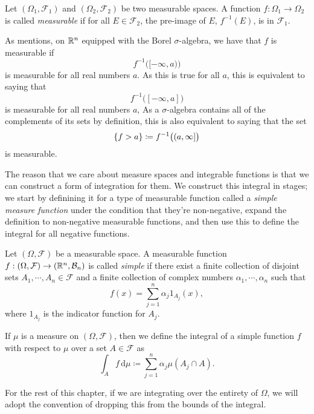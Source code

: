 \begin{definition}
  Let $(\Omega_1, \mathcal{F}_1)$ and $(\Omega_2, \mathcal{F}_2)$ be two measurable spaces. A function $f: \Omega_1 \to \Omega_2$ is called {\emph{measurable}} if for all $E \in \mathcal{F}_2$, the pre-image of $E$, $f^{-1}(E)$, is in $\mathcal{F}_1$.
\end{definition}
\begin{remark}
  As {\cite[p.28]{stein}} mentions, on $\mathbb{R}^n$ equipped with the Borel $\sigma$-algebra, we have that $f$ is measurable if
  \begin{equation*}
    f^{-1}\big( [-\infty, a) \big)
  \end{equation*}
  is measurable for all real numbers $a$. As this is true for all $a$, this is equivalent to saying that
  \begin{equation*}
    f^{-1}\big( [-\infty, a] \big)
  \end{equation*}
  is measurable for all real numbers $a$, As a $\sigma$-algebra contains all of the complements of its sets by definition, this is also equivalent to saying that the set
  \begin{equation*}
    \left\{f > a\right\} \coloneqq f^{-1}\big( (a, \infty] \big)
  \end{equation*}
  is measurable.
\end{remark}

The reason that we care about measure spaces and integrable functions is that we can construct a form of integration for them. We construct this integral in stages; we start by definining it for a type of measurable function called a {\emph{simple measure function}} under the condition that they're non-negative, expand the definition to non-negative measurable functions, and then use this to define the integral for all negative functions.

\begin{definition}
  Let $(\Omega, \mathcal{F})$ be a measurable space. A measurable function $f: (\Omega, \mathcal{F}) \to (\mathbb{R}^n, \mathcal{B}_n)$ is called {\emph{simple}} if there exist a finite collection of disjoint sets $A_1, \cdots, A_n \in \mathcal{F}$ and a finite collection of complex numbers $\alpha_1, \cdots, \alpha_n$ such that
  \begin{equation*}
    f(x) = \sum_{j=1}^{n} \alpha_j 1_{A_j}(x),
  \end{equation*}
  where $1_{A_j}$ is the indicator function for $A_j$.

  \medskip

  If $\mu$ is a measure on $(\Omega, \mathcal{F})$, then we define the integral of a simple function $f$ with respect to $\mu$ over a set $A \in \mathcal{F}$ as
  \begin{equation*}
    \int_{A} f \,\mathrm{d}\mu \coloneqq \sum_{j=1}^{n} \alpha_j \mu(A_j \cap A).
  \end{equation*}
\end{definition}
For the rest of this chapter, if we are integrating over the entirety of $\Omega$, we will adopt the convention of dropping this from the bounds of the integral.

